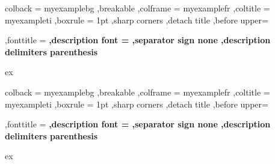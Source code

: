 
{%
	colback = myexamplebg
	,breakable
	,colframe = myexamplefr
	,coltitle = myexampleti
	,boxrule = 1pt
	,sharp corners
	,detach title
	,before upper=\tcbtitle\par\smallskip
	,fonttitle = \bfseries
	,description font = \mdseries
	,separator sign none
	,description delimiters parenthesis
}
{ex}

{%
	colback = myexamplebg
	,breakable
	,colframe = myexamplefr
	,coltitle = myexampleti
	,boxrule = 1pt
	,sharp corners
	,detach title
	,before upper=\tcbtitle\par\smallskip
	,fonttitle = \bfseries
	,description font = \mdseries
	,separator sign none
	,description delimiters parenthesis
}
{ex}

%
%
%

